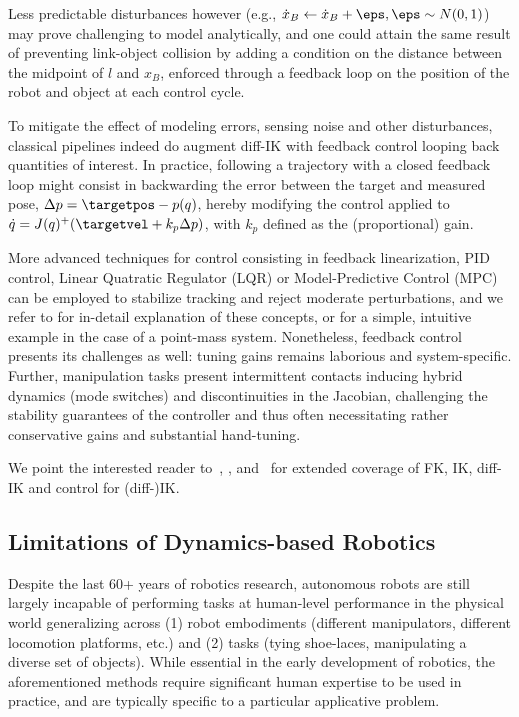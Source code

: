Less predictable disturbances however (e.g., \( \dot x_B \leftarrow \dot x_B + \eps, \eps \sim N(0,1) \)) may prove challenging to model analytically, and one could attain the same result of preventing link-object collision by adding a condition on the distance between the midpoint of \( l \) and \( x_B \), enforced through a feedback loop on the position of the robot and object at each control cycle.

To mitigate the effect of modeling errors, sensing noise and other disturbances, classical pipelines indeed do augment diff-IK with feedback control looping back quantities of interest.
In practice, following a trajectory with a closed feedback loop might consist in backwarding the error between the target and measured pose, \( \Delta p = \targetpos - p(q) \), hereby modifying the control applied to \( \dot q = J(q)^+ (\targetvel + k_p \Delta p ) \), with \( k_p \) defined as the (proportional) gain.

More advanced techniques for control consisting in feedback linearization, PID control, Linear Quatratic Regulator (LQR) or Model-Predictive Control (MPC) can be employed to stabilize tracking and reject moderate perturbations, and we refer to \citet[Chapter~8]{sicilianoSpringerHandbookRobotics2016} for in-detail explanation of these concepts, or \citep[Chapter~8]{tedrakeRoboticManipulationPerception} for a simple, intuitive example in the case of a point-mass system.
Nonetheless, feedback control presents its challenges as well: tuning gains remains laborious and system-specific. 
Further, manipulation tasks present intermittent contacts inducing hybrid dynamics (mode switches) and discontinuities in the Jacobian, challenging the stability guarantees of the controller and thus often necessitating rather conservative gains and substantial hand-tuning.

We point the interested reader to~\citet[Chapter~2,7,8]{sicilianoSpringerHandbookRobotics2016}, \citet[Chapter~6,11]{lynchModernRoboticsMechanics2017}, and~\citet[Chapter~3,8]{tedrakeRoboticManipulationPerception} for extended coverage of FK, IK, diff-IK and control for (diff-)IK.

\subsection{Limitations of Dynamics-based Robotics}
Despite the last 60+ years of robotics research, autonomous robots are still largely incapable of performing tasks at human-level performance in the physical world generalizing across (1) robot embodiments (different manipulators, different locomotion platforms, etc.) and (2) tasks (tying shoe-laces, manipulating a diverse set of objects).
While essential in the early development of robotics, the aforementioned methods require significant human expertise to be used in practice, and are typically specific to a particular applicative problem.

